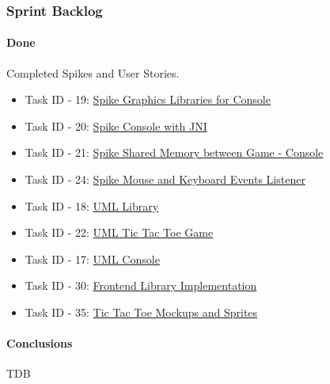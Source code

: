 \subsubsection{Sprint Backlog}

\paragraph{Done}

Completed Spikes and User Stories.
\begin{itemize}
    \item Task ID - 19: \href{https://tree.taiga.io/project/joseluis-teran-coffeetime/us/19?milestone=392128}{Spike Graphics Libraries for Console}
    \item Task ID - 20: \href{https://tree.taiga.io/project/joseluis-teran-coffeetime/us/20?milestone=392128}{Spike Console with JNI}
    \item Task ID - 21: \href{https://tree.taiga.io/project/joseluis-teran-coffeetime/us/21?milestone=392128}{Spike Shared Memory between Game - Console}
    \item Task ID - 24: \href{https://tree.taiga.io/project/joseluis-teran-coffeetime/us/24?milestone=392128}{Spike Mouse and Keyboard Events Listener}
    \item Task ID - 18: \href{https://tree.taiga.io/project/joseluis-teran-coffeetime/us/18?milestone=392128}{UML Library}
    \item Task ID - 22: \href{https://tree.taiga.io/project/joseluis-teran-coffeetime/us/22?milestone=392128}{UML Tic Tac Toe Game}
    \item Task ID - 17: \href{https://tree.taiga.io/project/joseluis-teran-coffeetime/us/17?milestone=392128}{UML Console}
    \item Task ID - 30: \href{https://tree.taiga.io/project/joseluis-teran-coffeetime/us/30?milestone=392128}{Frontend Library Implementation}
    \item Task ID - 35: \href{https://tree.taiga.io/project/joseluis-teran-coffeetime/us/35?milestone=392128}{Tic Tac Toe Mockups and Sprites}    
\end{itemize}

\paragraph{Conclusions}
TDB
